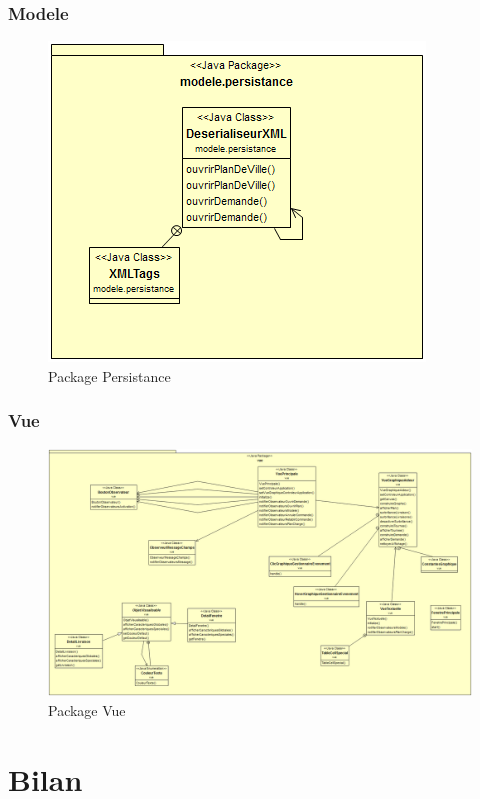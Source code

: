 \documentclass[10pt,a4paper]{book}
\begin{document}
\subsection{Modele}
\begin{figure}[h!]
    \centering
    \includegraphics[scale=0.40]{DcPersistance.png}
    \caption{Package Persistance}
\end{figure}
\newpage
\subsection{Vue}
\begin{figure}[h!]
    \centering
    \includegraphics[scale=0.28]{DcVue.png}
    \caption{Package Vue}
\end{figure}
\chapter{Bilan}
\end{document}
